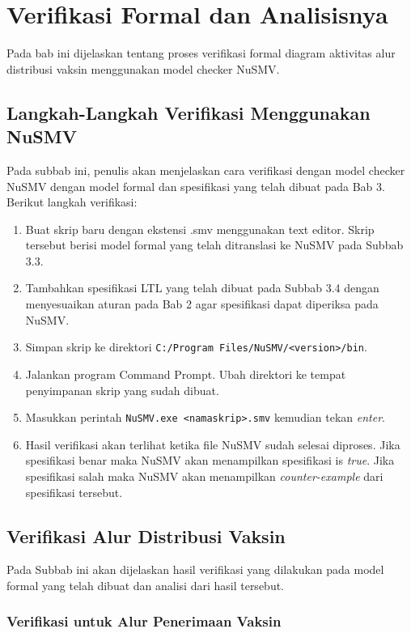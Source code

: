 \chapter{Verifikasi Formal dan Analisisnya}

Pada bab ini dijelaskan tentang proses verifikasi formal diagram aktivitas
alur distribusi vaksin menggunakan model checker NuSMV.

\section{Langkah-Langkah Verifikasi Menggunakan NuSMV}

Pada subbab ini, penulis akan menjelaskan cara verifikasi dengan model
checker NuSMV dengan model formal dan spesifikasi yang telah dibuat
pada Bab 3. Berikut langkah verifikasi:
\begin{enumerate}
	\item Buat skrip baru dengan ekstensi .smv menggunakan text editor. Skrip
	tersebut berisi model formal yang telah ditranslasi ke NuSMV pada
	Subbab 3.3.
	\item Tambahkan spesifikasi LTL yang telah dibuat pada Subbab 3.4 dengan
	menyesuaikan aturan pada Bab 2 agar spesifikasi dapat diperiksa
	pada NuSMV.
	\item Simpan skrip ke direktori \texttt{C:/Program Files/NuSMV/<version>/bin}.
	\item Jalankan program Command Prompt. Ubah direktori ke tempat penyimpanan
	skrip yang sudah dibuat.
	\item Masukkan perintah \texttt{NuSMV.exe <namaskrip>.smv} kemudian tekan \textit{enter}.
	\item Hasil verifikasi akan terlihat ketika file NuSMV sudah selesai diproses.
	Jika spesifikasi benar maka NuSMV akan menampilkan spesifikasi is \textit{true}.
	Jika spesifikasi salah maka NuSMV akan menampilkan \textit{counter-example}
	dari spesifikasi tersebut.
\end{enumerate}

\section{Verifikasi Alur Distribusi Vaksin}

Pada Subbab ini akan dijelaskan hasil verifikasi yang dilakukan pada
model formal yang telah dibuat dan analisi dari hasil tersebut.

\subsection{Verifikasi untuk Alur Penerimaan Vaksin}

